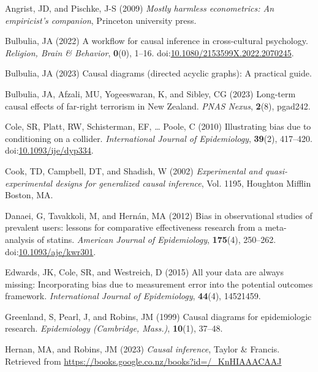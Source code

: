 \documentclass[
  singlecolumn]{article}
\newlength{\cslhangindent}
\newenvironment{CSLReferences}[2] %
 {\begin{list}{}{%
  \setlength{\itemindent}{0pt}
  \setlength{\leftmargin}{0pt}
  \setlength{\parsep}{0pt}
  \ifodd #1
   \setlength{\leftmargin}{\cslhangindent}
   \setlength{\itemindent}{-1\cslhangindent}
  \fi
  \setlength{\itemsep}{#2\baselineskip}}}
 {\end{list}}
\begin{document}
\label{refs}
\begin{CSLReferences}{1}{0}
Angrist, JD, and Pischke, J-S (2009) \emph{Mostly harmless econometrics:
An empiricist's companion}, Princeton university press.

Bulbulia, JA (2022) A workflow for causal inference in cross-cultural
psychology. \emph{Religion, Brain \& Behavior}, \textbf{0}(0), 1--16.
doi:\href{https://doi.org/10.1080/2153599X.2022.2070245}{10.1080/2153599X.2022.2070245}.

Bulbulia, JA (2023) Causal diagrams (directed acyclic graphs): A
practical guide.

Bulbulia, JA, Afzali, MU, Yogeeswaran, K, and Sibley, CG (2023)
Long-term causal effects of far-right terrorism in {N}ew {Z}ealand.
\emph{PNAS Nexus}, \textbf{2}(8), pgad242.

Cole, SR, Platt, RW, Schisterman, EF, \ldots{} Poole, C (2010)
Illustrating bias due to conditioning on a collider. \emph{International
Journal of Epidemiology}, \textbf{39}(2), 417--420.
doi:\href{https://doi.org/10.1093/ije/dyp334}{10.1093/ije/dyp334}.

Cook, TD, Campbell, DT, and Shadish, W (2002) \emph{Experimental and
quasi-experimental designs for generalized causal inference}, Vol. 1195,
Houghton Mifflin Boston, MA.

Danaei, G, Tavakkoli, M, and Hernán, MA (2012) Bias in observational
studies of prevalent users: lessons for comparative effectiveness
research from a meta-analysis of statins. \emph{American Journal of
Epidemiology}, \textbf{175}(4), 250--262.
doi:\href{https://doi.org/10.1093/aje/kwr301}{10.1093/aje/kwr301}.

Edwards, JK, Cole, SR, and Westreich, D (2015) All your data are always
missing: Incorporating bias due to measurement error into the potential
outcomes framework. \emph{International Journal of Epidemiology},
\textbf{44}(4), 14521459.

Greenland, S, Pearl, J, and Robins, JM (1999) Causal diagrams for
epidemiologic research. \emph{Epidemiology (Cambridge, Mass.)},
\textbf{10}(1), 37--48.

Hernan, MA, and Robins, JM (2023) \emph{Causal inference}, Taylor \&
Francis. Retrieved from
\url{https://books.google.co.nz/books?id=/_KnHIAAACAAJ}


\end{CSLReferences}
\end{document}
